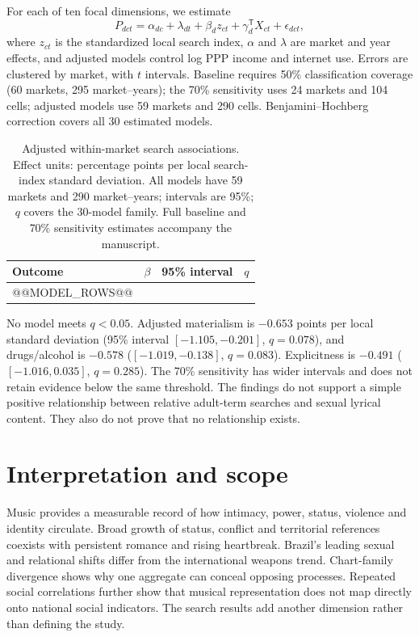\documentclass[10pt,a4paper,twocolumn]{article}
\begin{document}
For each of ten focal dimensions, we estimate
\begin{equation}
 P_{dct}=\alpha_{dc}+\lambda_{dt}+\beta_d z_{ct}+\gamma_d^{\mathsf T}X_{ct}+\epsilon_{dct},
\end{equation}
where $z_{ct}$ is the standardized local search index, $\alpha$ and $\lambda$ are market and year effects, and adjusted models control log PPP income and internet use. Errors are clustered by market, with $t$ intervals. Baseline requires 50\% classification coverage (60 markets, 295 market--years); the 70\% sensitivity uses 24 markets and 104 cells; adjusted models use 59 markets and 290 cells. Benjamini--Hochberg correction covers all 30 estimated models.

\begin{table}[t]
\caption{Adjusted within-market search associations. Effect units: percentage points per local search-index standard deviation. All models have 59 markets and 290 market--years; intervals are 95\%; $q$ covers the 30-model family. Full baseline and 70\% sensitivity estimates accompany the manuscript.}
\label{tab:models}
\centering\scriptsize\setlength{\tabcolsep}{3pt}
\begin{tabularx}{\columnwidth}{@{}Xrrr@{}}
\toprule Outcome & $\beta$ & 95\% interval & $q$ \\
\midrule
@@MODEL_ROWS@@
\bottomrule
\end{tabularx}
\end{table}

No model meets $q<0.05$. Adjusted materialism is $-0.653$ points per local standard deviation (95\% interval $[-1.105,-0.201]$, $q=0.078$), and drugs/alcohol is $-0.578$ ($[-1.019,-0.138]$, $q=0.083$). Explicitness is $-0.491$ ($[-1.016,0.035]$, $q=0.285$). The 70\% sensitivity has wider intervals and does not retain evidence below the same threshold. The findings do not support a simple positive relationship between relative adult-term searches and sexual lyrical content. They also do not prove that no relationship exists.

\balance
\section{Interpretation and scope}
Music provides a measurable record of how intimacy, power, status, violence and identity circulate. Broad growth of status, conflict and territorial references coexists with persistent romance and rising heartbreak. Brazil's leading sexual and relational shifts differ from the international weapons trend. Chart-family divergence shows why one aggregate can conceal opposing processes. Repeated social correlations further show that musical representation does not map directly onto national social indicators. The search results add another dimension rather than defining the study.
\end{document}
